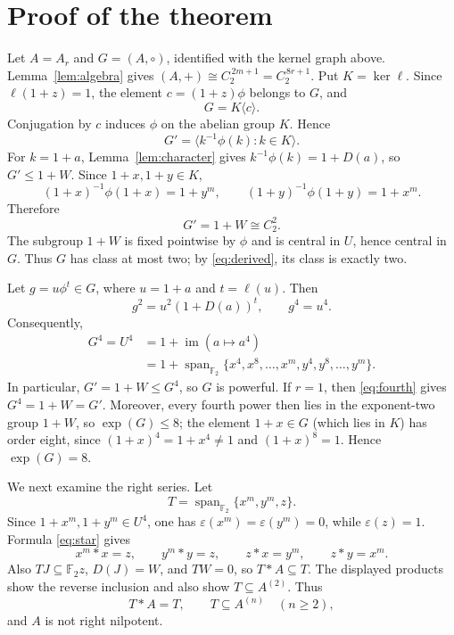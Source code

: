 \documentclass[11pt]{amsart}
\newcommand{\F}{\mathbb{F}}
\newcommand{\Span}{\operatorname{span}}
\begin{document}
\section{Proof of the theorem}

Let $A=A_r$ and $G=(A,\circ)$, identified with the kernel graph above.
Lemma~\ref{lem:algebra} gives
$(A,+)\cong C_2^{\,2m+1}=C_2^{\,8r+1}$. Put
$K=\ker\ell$. Since $\ell(1+z)=1$, the element
$c=(1+z)\phi$ belongs to $G$, and
\[
 G=K\langle c\rangle.
\]
Conjugation by $c$ induces $\phi$ on the abelian group $K$. Hence
\[
 G'=\langle k^{-1}\phi(k):k\in K\rangle.
\]
For $k=1+a$, Lemma~\ref{lem:character} gives
$k^{-1}\phi(k)=1+D(a)$, so $G'\leq1+W$. Since
$1+x,1+y\in K$,
\[
 (1+x)^{-1}\phi(1+x)=1+y^m,
 \qquad
 (1+y)^{-1}\phi(1+y)=1+x^m.
\]
Therefore
\begin{equation}\label{eq:derived}
 G'=1+W\cong C_2^2.
\end{equation}
The subgroup $1+W$ is fixed pointwise by $\phi$ and is central in $U$,
hence central in $G$. Thus $G$ has class at most two; by
\eqref{eq:derived}, its class is exactly two.

Let $g=u\phi^t\in G$, where $u=1+a$ and $t=\ell(u)$. Then
\[
 g^2=u^2(1+D(a))^t,
 \qquad
 g^4=u^4.
\]
Consequently,
\begin{equation}\label{eq:fourth}
 \begin{split}
 G^4=U^4
 &=1+\operatorname{im}(a\mapsto a^4)\\
 &=1+\Span_{\F_2}\{x^4,x^8,\ldots,x^m,
                         y^4,y^8,\ldots,y^m\}.
 \end{split}
\end{equation}
In particular, $G'=1+W\leq G^4$, so $G$ is powerful. If $r=1$, then
\eqref{eq:fourth} gives $G^4=1+W=G'$. Moreover, every fourth power then
lies in the exponent-two group $1+W$, so $\operatorname{exp}(G)\leq8$;
the element $1+x\in G$ (which lies in $K$) has order eight, since
$(1+x)^4=1+x^4\neq1$ and $(1+x)^8=1$. Hence
$\operatorname{exp}(G)=8$.

We next examine the right series. Let
\[
 T=\Span_{\F_2}\{x^m,y^m,z\}.
\]
Since $1+x^m,1+y^m\in U^4$, one has
$\varepsilon(x^m)=\varepsilon(y^m)=0$, while $\varepsilon(z)=1$. Formula
\eqref{eq:star} gives
\[
 x^m*x=z,
 \qquad
 y^m*y=z,
 \qquad
 z*x=y^m,
 \qquad
 z*y=x^m.
\]
Also $TJ\subseteq\F_2z$, $D(J)=W$, and $TW=0$, so
$T*A\subseteq T$. The displayed products show the reverse inclusion and
also show $T\subseteq A^{(2)}$. Thus
\[
 T*A=T,
 \qquad
 T\subseteq A^{(n)}\quad(n\geq2),
\]
and $A$ is not right nilpotent.
\end{document}
